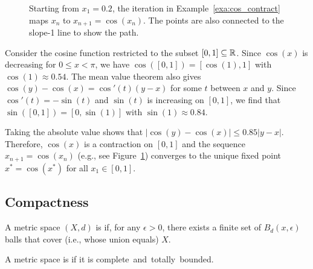 \begin{figure}[t]
\centering

\vspace{-5mm}
\caption{\label{fig:cos_contract}Starting from $x_1 = 0.2$, the iteration in Example~\ref{exa:cos_contract} maps $x_n$ to $x_{n+1}= \cos(x_n)$.  The points are also connected to the slope-1 line to show the path.}
\end{figure}

\begin{example} \label{exa:cos_contract}
Consider the cosine function restricted to the subset $[0,1]\subseteq \mathbb{R}$.
Since $\cos(x)$ is decreasing for $0 \leq x < \pi$, we have $\cos([0,1]) = [\cos(1),1]$ with $\cos(1) \approx 0.54$.
The mean value theorem also gives $\cos(y)-\cos(x)=\cos'(t)(y-x)$ for some $t$ between $x$ and $y$.
Since $\cos '(t) = -\sin(t)$ and $\sin(t)$ is increasing on $[0,1]$, we find that $\sin([0,1]) = [0,\sin(1)]$ with $\sin(1) \approx 0.84$.

Taking the absolute value shows that $| \cos(y) - \cos(x) | \leq 0.85 |y-x|$.
Therefore, $\cos(x)$ is a contraction on $[0,1]$ and the sequence $x_{n+1} = \cos(x_n)$ (e.g., see Figure~\ref{fig:cos_contract}) converges to the unique fixed point $x^* = \cos(x^*)$ for all $x_1 \in [0,1]$.
\end{example}



\subsection{Compactness}
\label{sec:metspace_compact}

\begin{definition}
A metric space $(X,d)$ is  if, for any $\epsilon > 0$, there exists a finite set of $B_d (x,\epsilon)$ balls that cover (i.e., whose union equals) $X$.
\end{definition}

\begin{definition}
A metric space is  if it is complete~and~totally~bounded.
\end{definition}

